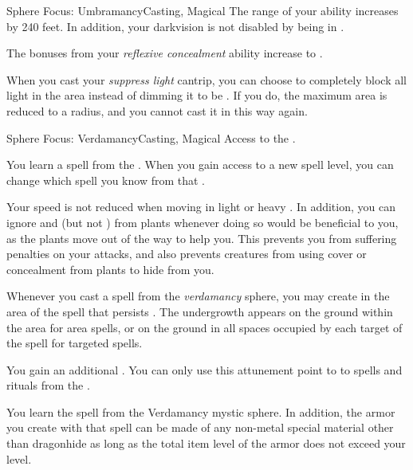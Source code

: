 \begin{feat}{Sphere Focus: Umbramancy}{Casting, Magical}
         The range of your  ability increases by 240 feet.
        In addition, your darkvision is not disabled by being in .

          The bonuses from your \textit{reflexive concealment} ability increase to .

         When you cast your \textit{suppress light} cantrip, you can choose to completely block all light in the area instead of dimming it to be .
        If you do, the maximum area is reduced to a \medarea radius, and you  cannot cast it in this way again.
    \end{feat}

    \begin{feat}{Sphere Focus: Verdamancy}{Casting, Magical}
        \featpre Access to the  .

         You learn a spell from the  .
        When you gain access to a new spell level, you can change which spell you know from that .

         Your speed is not reduced when moving in light or heavy .
        In addition, you can ignore  and  (but not ) from plants whenever doing so would be beneficial to you, as the plants move out of the way to help you.
        This prevents you from suffering penalties on your attacks, and also prevents creatures from using cover or concealment from plants to hide from you.

         Whenever you cast a spell from the \textit{verdamancy} sphere, you may create  in the area of the spell that persists .
        The undergrowth appears on the ground within the area for area spells, or on the ground in all spaces occupied by each target of the spell for targeted spells.

         You gain an additional .
        You can only use this attunement point to  to spells and rituals from the  .

         You learn the  spell from the Verdamancy mystic sphere.
        In addition, the armor you create with that spell can be made of any non-metal special material other than dragonhide as long as the total item level of the armor does not exceed your level.


\end{feat}
